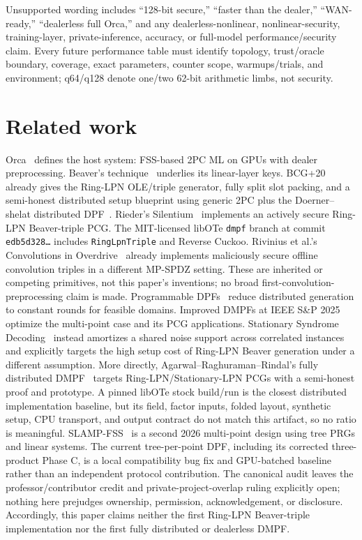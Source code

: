 \documentclass[11pt]{article}
\begin{document}
Unsupported wording includes ``128-bit secure,'' ``faster than the dealer,''
``WAN-ready,'' ``dealerless full Orca,'' and any dealerless-nonlinear,
nonlinear-security, training-layer, private-inference, accuracy, or full-model
performance/security claim.
Every future performance table must identify topology, trust/oracle boundary,
coverage, exact parameters, counter scope, warmups/trials, and environment;
q64/q128 denote one/two 62-bit arithmetic limbs, not security.

\section{Related work}
\label{sec:related}

Orca~\cite{jawalkar2024orca} defines the host system: FSS-based 2PC ML on
GPUs with dealer preprocessing. Beaver's technique~\cite{beaver1991}
underlies its linear-layer keys. BCG+20~\cite{boyle2020ringlpn} already gives
the Ring-LPN OLE/triple generator, fully split slot packing, and a semi-honest
distributed setup blueprint using generic 2PC plus the Doerner--shelat
distributed DPF~\cite{doerner2017floram}. Rieder's
Silentium~\cite{rieder2025silentium} implements an actively secure Ring-LPN
Beaver-triple PCG. The MIT-licensed libOTe \texttt{dmpf} branch at commit
\texttt{edb5d328\ldots} includes \texttt{RingLpnTriple} and Reverse Cuckoo.
Rivinius et al.'s Convolutions in Overdrive~\cite{rivinius2023convolutions}
already implements maliciously secure offline convolution triples in a
different MP-SPDZ setting. These are inherited or competing primitives, not
this paper's inventions; no broad first-convolution-preprocessing claim is made.
Programmable DPFs~\cite{boyle2022programmable} reduce distributed generation
to constant rounds for feasible domains. Improved DMPFs at IEEE S\&P
2025~\cite{boyle2025dmpf} optimize the multi-point case and its PCG
applications. Stationary Syndrome Decoding~\cite{kolesnikov2025stationary}
instead amortizes a shared noise support across correlated instances and
explicitly targets the high setup cost of Ring-LPN Beaver generation under a
different assumption. More directly, Agarwal--Raghuraman--Rindal's fully
distributed DMPF~\cite{agarwal2026dmpf} targets Ring-LPN/Stationary-LPN PCGs
with a semi-honest proof and prototype. A pinned libOTe stock build/run is the
closest distributed implementation baseline, but its field, factor inputs,
folded layout, synthetic setup, CPU transport, and output contract do not match
this artifact, so no ratio is meaningful. SLAMP-FSS~\cite{kulaots2026slamp} is
a second 2026 multi-point design using tree PRGs and linear systems. The current
tree-per-point DPF, including its corrected three-product Phase C, is a local
compatibility bug fix and GPU-batched baseline rather than an independent
protocol contribution. The canonical audit leaves the professor/contributor
credit and private-project-overlap ruling explicitly open; nothing here
prejudges ownership, permission, acknowledgement, or disclosure. Accordingly,
this paper claims neither the first Ring-LPN Beaver-triple implementation nor
the first fully distributed or dealerless DMPF.
\end{document}
